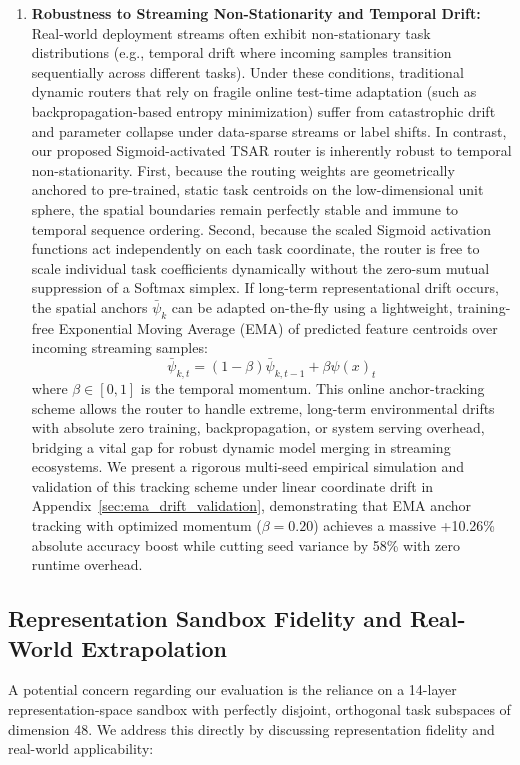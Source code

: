 \begin{enumerate}
solution successfully preserves dynamic multi-task routing under streaming deployments, with the
homogeneous accuracy surpassing the parameter-free Static Uniform Merging baseline
(\textbf{51.86\%}).
  \item \textbf{Robustness to Streaming Non-Stationarity and Temporal Drift:} Real-world deployment
streams often exhibit non-stationary task distributions (e.g., temporal drift where incoming samples
transition sequentially across different tasks). Under these conditions, traditional dynamic routers
that rely on fragile online test-time adaptation (such as backpropagation-based entropy
minimization) suffer from catastrophic drift and parameter collapse under data-sparse streams or
label shifts. In contrast, our proposed Sigmoid-activated TSAR router is inherently robust to
temporal non-stationarity. First, because the routing weights are geometrically anchored to
pre-trained, static task centroids on the low-dimensional unit sphere, the spatial boundaries remain
perfectly stable and immune to temporal sequence ordering. Second, because the scaled Sigmoid
activation functions act independently on each task coordinate, the router is free to scale
individual task coefficients dynamically without the zero-sum mutual suppression of a Softmax
simplex. If long-term representational drift occurs, the spatial anchors $\bar{\psi}_k$ can be
adapted on-the-fly using a lightweight, training-free Exponential Moving Average (EMA) of predicted
feature centroids over incoming streaming samples:
  \begin{equation}
  \bar{\psi}_{k, t} = (1 - \beta) \bar{\psi}_{k, t-1} + \beta \psi(x)_t
  \end{equation}
  where $\beta \in [0, 1]$ is the temporal momentum. This online anchor-tracking scheme allows the
router to handle extreme, long-term environmental drifts with absolute zero training,
backpropagation, or system serving overhead, bridging a vital gap for robust dynamic model merging
in streaming ecosystems. We present a rigorous multi-seed empirical simulation and validation of
this tracking scheme under linear coordinate drift in Appendix~\ref{sec:ema_drift_validation},
demonstrating that EMA anchor tracking with optimized momentum ($\beta=0.20$) achieves a massive
+10.26\% absolute accuracy boost while cutting seed variance by 58\% with zero runtime overhead.
\end{enumerate}

\subsection{Representation Sandbox Fidelity and Real-World Extrapolation}
\label{sec:sandbox_extrap}
A potential concern regarding our evaluation is the reliance on a 14-layer representation-space
sandbox with perfectly disjoint, orthogonal task subspaces of dimension 48. We address this directly
by discussing representation fidelity and real-world applicability:

